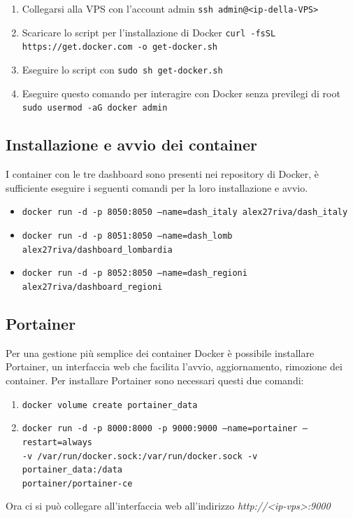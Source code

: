 \begin{enumerate}
\item Collegarsi alla VPS con l'account admin \texttt{ssh admin@<ip-della-VPS>}
\item Scaricare lo script per l'installazione di Docker \texttt{curl -fsSL https://get.docker.com -o get-docker.sh}
\item Eseguire lo script con \texttt{sudo sh get-docker.sh}
\item Eseguire questo comando per interagire con Docker senza previlegi di root \texttt{sudo usermod -aG docker admin}
\end{enumerate}

\subsection{Installazione e avvio dei container}
I container con le tre dashboard sono presenti nei repository di Docker, è sufficiente eseguire i seguenti comandi per la loro installazione e avvio.
\begin{itemize}
\item \texttt{docker run -d -p 8050:8050 --name=dash\_italy alex27riva/dash\_italy}
\item \texttt{docker run -d -p 8051:8050 --name=dash\_lomb alex27riva/dashboard\_lombardia}
\item \texttt{docker run -d -p 8052:8050 --name=dash\_regioni alex27riva/dashboard\_regioni}
\end{itemize}

\subsection{Portainer}
Per una gestione più semplice dei container Docker è possibile installare Portainer, un interfaccia web che facilita l'avvio, aggiornamento, rimozione dei container.
Per installare Portainer sono necessari questi due comandi:
\begin{enumerate}
    \item \texttt{docker volume create portainer\_data}
    \item \texttt{docker run -d -p 8000:8000 -p 9000:9000 --name=portainer --restart=always\\ -v /var/run/docker.sock:/var/run/docker.sock -v portainer\_data:/data\\ portainer/portainer-ce}
\end{enumerate}
Ora ci si può collegare all'interfaccia web all'indirizzo \emph{http://\textless ip-vps\textgreater:9000}

